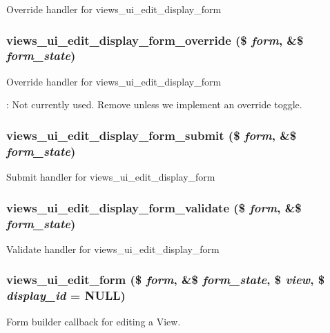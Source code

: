 \label{admin_8inc_a645b4cf556061727a6d09a0d64770b30}
Override handler for views\_\-ui\_\-edit\_\-display\_\-form \hypertarget{admin_8inc_a5d8a67bc769fcccdad46636e063079d2}{
\subsubsection[{views\_\-ui\_\-edit\_\-display\_\-form\_\-override}]{\setlength{\rightskip}{0pt plus 5cm}views\_\-ui\_\-edit\_\-display\_\-form\_\-override (\$ {\em form}, \/  \&\$ {\em form\_\-state})}}
\label{admin_8inc_a5d8a67bc769fcccdad46636e063079d2}
Override handler for views\_\-ui\_\-edit\_\-display\_\-form

: Not currently used. Remove unless we implement an override toggle. \hypertarget{admin_8inc_a2272bcea1334751c9c2e8d6b04ae64af}{
\subsubsection[{views\_\-ui\_\-edit\_\-display\_\-form\_\-submit}]{\setlength{\rightskip}{0pt plus 5cm}views\_\-ui\_\-edit\_\-display\_\-form\_\-submit (\$ {\em form}, \/  \&\$ {\em form\_\-state})}}
\label{admin_8inc_a2272bcea1334751c9c2e8d6b04ae64af}
Submit handler for views\_\-ui\_\-edit\_\-display\_\-form \hypertarget{admin_8inc_aa266b14e787266b24a7096f58d41667c}{
\subsubsection[{views\_\-ui\_\-edit\_\-display\_\-form\_\-validate}]{\setlength{\rightskip}{0pt plus 5cm}views\_\-ui\_\-edit\_\-display\_\-form\_\-validate (\$ {\em form}, \/  \&\$ {\em form\_\-state})}}
\label{admin_8inc_aa266b14e787266b24a7096f58d41667c}
Validate handler for views\_\-ui\_\-edit\_\-display\_\-form \hypertarget{admin_8inc_a3c7bbae87e55e6a531c04c8135bd1231}{
\subsubsection[{views\_\-ui\_\-edit\_\-form}]{\setlength{\rightskip}{0pt plus 5cm}views\_\-ui\_\-edit\_\-form (\$ {\em form}, \/  \&\$ {\em form\_\-state}, \/  \$ {\em view}, \/  \$ {\em display\_\-id} = {\ttfamily NULL})}}
\label{admin_8inc_a3c7bbae87e55e6a531c04c8135bd1231}
Form builder callback for editing a View.

